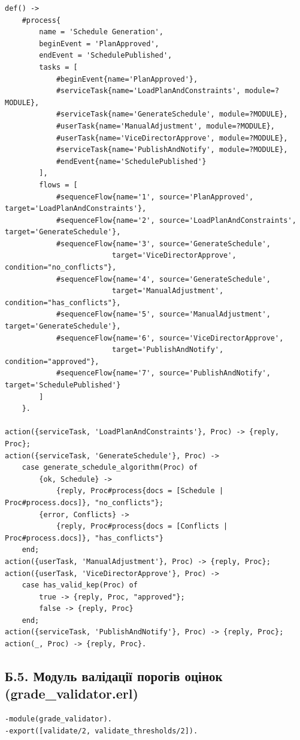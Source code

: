 \documentclass{article}
\begin{document}
\begin{appendix}
\begin{verbatim}
def() ->
    #process{
        name = 'Schedule Generation',
        beginEvent = 'PlanApproved',
        endEvent = 'SchedulePublished',
        tasks = [
            #beginEvent{name='PlanApproved'},
            #serviceTask{name='LoadPlanAndConstraints', module=?MODULE},
            #serviceTask{name='GenerateSchedule', module=?MODULE},
            #userTask{name='ManualAdjustment', module=?MODULE},
            #userTask{name='ViceDirectorApprove', module=?MODULE},
            #serviceTask{name='PublishAndNotify', module=?MODULE},
            #endEvent{name='SchedulePublished'}
        ],
        flows = [
            #sequenceFlow{name='1', source='PlanApproved', target='LoadPlanAndConstraints'},
            #sequenceFlow{name='2', source='LoadPlanAndConstraints', target='GenerateSchedule'},
            #sequenceFlow{name='3', source='GenerateSchedule', 
                         target='ViceDirectorApprove', condition="no_conflicts"},
            #sequenceFlow{name='4', source='GenerateSchedule', 
                         target='ManualAdjustment', condition="has_conflicts"},
            #sequenceFlow{name='5', source='ManualAdjustment', target='GenerateSchedule'},
            #sequenceFlow{name='6', source='ViceDirectorApprove', 
                         target='PublishAndNotify', condition="approved"},
            #sequenceFlow{name='7', source='PublishAndNotify', target='SchedulePublished'}
        ]
    }.

action({serviceTask, 'LoadPlanAndConstraints'}, Proc) -> {reply, Proc};
action({serviceTask, 'GenerateSchedule'}, Proc) ->
    case generate_schedule_algorithm(Proc) of
        {ok, Schedule} -> 
            {reply, Proc#process{docs = [Schedule | Proc#process.docs]}, "no_conflicts"};
        {error, Conflicts} -> 
            {reply, Proc#process{docs = [Conflicts | Proc#process.docs]}, "has_conflicts"}
    end;
action({userTask, 'ManualAdjustment'}, Proc) -> {reply, Proc};
action({userTask, 'ViceDirectorApprove'}, Proc) ->
    case has_valid_kep(Proc) of
        true -> {reply, Proc, "approved"};
        false -> {reply, Proc}
    end;
action({serviceTask, 'PublishAndNotify'}, Proc) -> {reply, Proc};
action(_, Proc) -> {reply, Proc}.
\end{verbatim}

\subsection{Б.5. Модуль валідації порогів оцінок (grade\_validator.erl)}
\begin{verbatim}
-module(grade_validator).
-export([validate/2, validate_thresholds/2]).


\end{verbatim}
\end{appendix}
\end{document}
